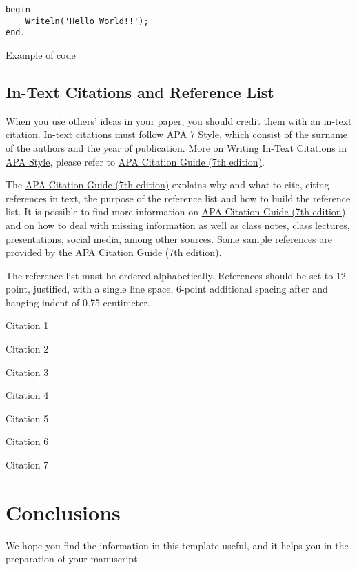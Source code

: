 \documentclass[english, spanish, brazilian]{RBIEarticle} %
\begin{document}
\begin{code}[h]
	\begin{lstlisting}
begin
    Writeln('Hello World!!');
end.
	\end{lstlisting}
	\caption{Example of code}
	\label{code:one}
\end{code}


\subsection{In-Text Citations and Reference List}

When you use others' ideas in your paper, you should credit them with an in-text citation. In-text citations must follow APA 7 Style, which consist of the surname of the authors and the year of publication. More on \href{https://apastyle.apa.org/}{Writing In-Text Citations in APA Style}, please refer to \href{https://libguides.brenau.edu/APA7}{APA Citation Guide (7th edition)}.

The  \href{https://libguides.brenau.edu/APA7}{APA Citation Guide (7th edition)} explains why and what to cite, citing references in text, the purpose of the reference list and how to build the reference list. It is possible to find more information on  \href{https://libguides.brenau.edu/APA7}{APA Citation Guide (7th edition)} and on how to deal with missing information as well as class notes, class lectures, presentations, social media, among other sources. Some sample references are provided by the  \href{https://libguides.brenau.edu/APA7}{APA Citation Guide (7th edition)}.

The reference list must be ordered alphabetically. References should be set to 12-point, justified, with a single line space, 6-point additional spacing after and hanging indent of 0.75 centimeter.

Citation 1 \parencite{Baker2011}

Citation 2 \parencite{Seffrin2013}

Citation 3 \parencite{Brasil2008}

Citation 4 \parencite{Kautzman2015}

Citation 5 \parencite{Sweller1991}

Citation 6 \parencite{Clark2006}

Citation 7 \parencite{Mason2012}


\section{Conclusions}
We hope you find the information in this template useful, and it helps you in the preparation of your manuscript.
\end{document}
